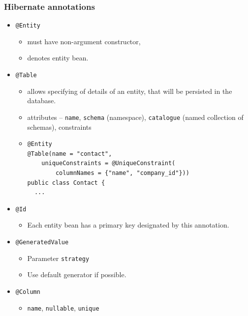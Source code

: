 \documentclass[10pt,xcolor=pdflatex]{beamer}
\begin{document}
\begin{frame}[fragile]\frametitle{Hibernate annotations}
	\begin{itemize}
		\item \texttt{@Entity}
          \begin{itemize}
        	\item must have non-argument constructor,
        	\item denotes entity bean.
          \end{itemize}
		\item \texttt{@Table}
          \begin{itemize}
        	\item allows specifying of details of an entity, that will be persisted in the database.
			\item attributes -- \texttt{name}, \texttt{schema} (namespace), \texttt{catalogue} (named collection of schemas), constraints
            \item[]  \begin{footnotesize}
            \begin{verbatim}
@Entity
@Table(name = "contact", 
    uniqueConstraints = @UniqueConstraint(
        columnNames = {"name", "company_id"}))
public class Contact {
  ...
\end{verbatim}\end{footnotesize}
          \end{itemize}
		\item \texttt{@Id}
          \begin{itemize}
        	\item Each entity bean has a primary key designated by this annotation.
          \end{itemize}
		\item \texttt{@GeneratedValue}
          \begin{itemize}
        	\item Parameter \texttt{strategy}
        	\item Use default generator if possible.
          \end{itemize}
		\item \texttt{@Column}
          \begin{itemize}
        	\item \texttt{name}, \texttt{nullable}, \texttt{unique}
          \end{itemize}
	\end{itemize}
\end{frame}
\end{document}
